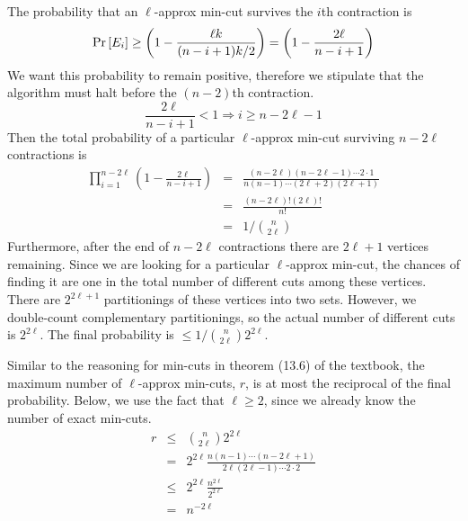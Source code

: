 \documentclass[12pt]{article}
\def\PR#1{\mathop{\rm {Pr}}\left[#1\right]}
\begin{document}
\begin{enumerate}
The probability that an $\ell$-approx min-cut survives the $i$th
contraction is
%
\begin{displaymath}
\PR{E_i} \ge \left(1 - \frac{\ell k}{(n-i+1)k / 2}\right) =
\left(1 - \frac{2 \ell}{n-i+1}\right)
\end{displaymath}
%
We want this probability to remain positive, therefore we stipulate that
the algorithm must halt before the $(n-2)$th contraction.
%
\begin{displaymath}
\frac{2\ell}{n-i+1} < 1 \Rightarrow i \ge n - 2\ell - 1
\end{displaymath}
%
Then the total probability of a particular $\ell$-approx min-cut surviving
$n - 2\ell$ contractions is
%
\begin{eqnarray*}
\prod_{i = 1}^{n - 2\ell}\left(1 - \frac{2\ell}{n-i+1}\right) & = &
\frac{(n-2\ell)(n-2\ell-1)\cdots2\cdot 1}{n(n-1)\cdots(2\ell+2)(2\ell+1)}\\
& = & \frac{(n-2\ell)!(2\ell)!}{n!}\\
& = & 1 / \binom{n}{2\ell}
\end{eqnarray*}
%
Furthermore, after the end of $n - 2\ell$ contractions there are
$2\ell + 1$ vertices remaining. Since we are looking for a particular
$\ell$-approx min-cut, the chances of finding it are one in the
total number of different cuts among these vertices. There are
$2^{2\ell + 1}$ partitionings of these vertices into two sets. However,
we double-count complementary partitionings, so the actual number of
different cuts is $2^{2\ell}$. The final probability is
$\le  1 / \binom{n}{2\ell}2^{2\ell}$.

Similar to the reasoning for
min-cuts in theorem (13.6) of the textbook, the maximum number of
$\ell$-approx min-cuts, $r$,
is at most the reciprocal of the final probability.
Below, we use the fact that $\ell \ge 2$, since we already know the number
of exact min-cuts.
%
\begin{eqnarray*}
r & \le & \binom{n}{2\ell}2^{2\ell}\\
  & = & 2^{2\ell}\frac{n(n-1)\cdots(n-2\ell+1)}{2\ell(2\ell-1)\cdots 2 \cdot 2}\\
  & \le & 2^{2\ell}\frac{n^{2\ell}}{2^{2\ell}}\\
  & = & n^{-2\ell}
\end{eqnarray*}

\end{enumerate}

\pagebreak

\end{document}

